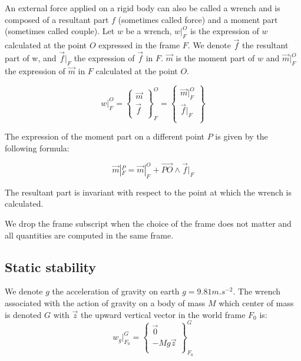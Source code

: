 An external force applied on a rigid body can also be called a wrench and is composed of a resultant part $f$ (sometimes called force) and a moment part (sometimes called couple).
Let $w$ be a wrench, $w|_F^O$ is the expression of $w$ calculated at the point $O$ expressed in the frame $F$.
We denote $\vec{f}$ the resultant part of w, and $\vec{f}|_F$ the expression of $\vec{f}$ in $F$.
$\vec{m}$ is the moment part of $w$ and $\vec{m}|_F^O$ the expression of $\vec{m}$ in $F$ calculated at the point $O$.

\begin{equation}
  w|_F^O = \left\{ \begin{array}{r}
    \vec{m}\\
    \vec{f}\\
  \end{array} \right\}^O_F
  = \left\{ \begin{array}{r}
    \vec{m}|_F^O\\
    \vec{f}|_F\\
  \end{array}\right\}
\end{equation}

The expression of the moment part on a different point $P$ is given by the following formula:

\begin{equation}
  \vec{m}|_F^P = \vec{m}|_F^O + \overrightarrow{PO} \wedge \vec{f}|_F
\end{equation}

The resultant part is invariant with respect to the point at which the wrench is calculated.

We drop the frame subscript when the choice of the frame does not matter and all quantities are computed in the same frame.



\subsection{Static stability}
\label{sub:static_stability}


We denote $g$ the acceleration of gravity on earth $g = 9.81 m.s^{-2}$.
The wrench associated with the action of gravity on a body of mass $M$ which center of mass is denoted $G$ with $\vec{z}$ the upward vertical vector in the world frame $F_0$ is:
\begin{equation}
  w_g|^G_{F_0} = \left\{ \begin{array}{r}
     \vec{0} \\
     -Mg\vec{z} \\
 \end{array}\right\}^G_{F_0}
\end{equation}

